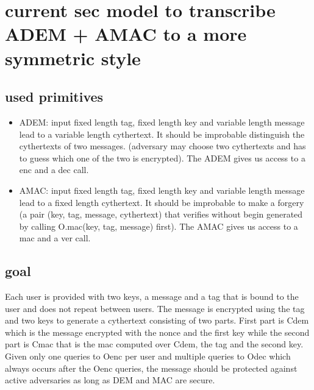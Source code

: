 \documentclass{article}
\begin{document}
\section{current sec model to transcribe ADEM + AMAC to a more symmetric style}
\subsection{used primitives}
\begin{itemize}
    \item ADEM: input fixed length tag, fixed length key and variable length message lead to a variable length cythertext. It should be improbable distinguish the cythertexts of two messages. (adversary may choose two cythertexts and has to guess which one of the two is encrypted). The ADEM gives us access to a enc and a dec call.
    
    \item AMAC: input fixed length tag, fixed length key and variable length message lead to a fixed length cythertext. It should be improbable to make a forgery (a pair (key, tag, message, cythertext) that verifies without begin generated by calling O.mac(key, tag, message) first). The AMAC gives us access to a mac and a ver call.
\end{itemize}

\subsection{goal}
Each user is provided with two keys, a message and a tag that is bound to the user and does not repeat between users. The message is encrypted using the tag and two keys to generate a cythertext consisting of two parts. First part is Cdem which is the message encrypted with the nonce and the first key while the second part is Cmac that is the mac computed over Cdem, the tag and the second key. Given only one queries to Oenc per user and multiple queries to Odec which always occurs after the Oenc queries, the message should be protected against active adversaries as long as DEM and MAC are secure.
\end{document}
